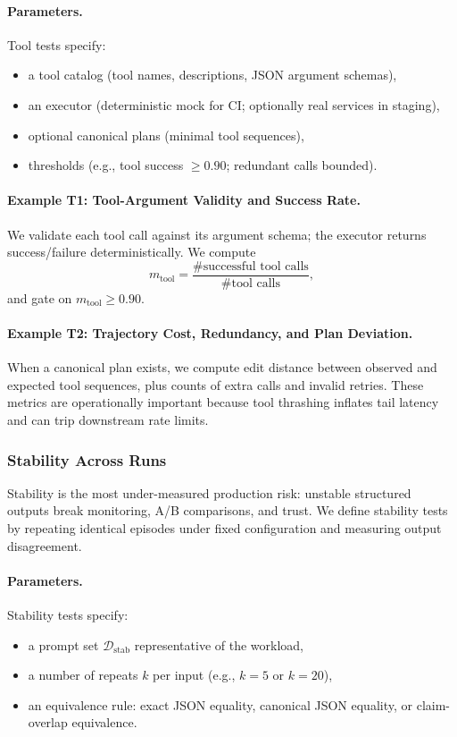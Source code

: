 \paragraph{Parameters.}
Tool tests specify:
\begin{itemize}[leftmargin=12pt]
    \item a tool catalog (tool names, descriptions, JSON argument schemas),
    \item an executor (deterministic mock for CI; optionally real services in staging),
    \item optional canonical plans (minimal tool sequences),
    \item thresholds (e.g., tool success $\ge 0.90$; redundant calls bounded).
\end{itemize}

\paragraph{Example T1: Tool-Argument Validity and Success Rate.}
We validate each tool call against its argument schema; the executor returns success/failure deterministically.
We compute
\[
m_{\text{tool}} = \frac{\#\text{successful tool calls}}{\#\text{tool calls}},
\]
and gate on $m_{\text{tool}} \ge 0.90$.

\paragraph{Example T2: Trajectory Cost, Redundancy, and Plan Deviation.}
When a canonical plan exists, we compute edit distance between observed and expected tool sequences, plus counts of extra calls and invalid retries.
These metrics are operationally important because tool thrashing inflates tail latency and can trip downstream rate limits.

\subsubsection{Stability Across Runs}

Stability is the most under-measured production risk: unstable structured outputs break monitoring, A/B comparisons, and trust.
We define stability tests by repeating identical episodes under fixed configuration and measuring output disagreement.

\paragraph{Parameters.}
Stability tests specify:
\begin{itemize}[leftmargin=12pt]
    \item a prompt set $\mathcal{D}_{\text{stab}}$ representative of the workload,
    \item a number of repeats $k$ per input (e.g., $k=5$ or $k=20$),
    \item an equivalence rule: exact JSON equality, canonical JSON equality, or claim-overlap equivalence.
\end{itemize}

